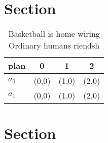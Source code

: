 \documentclass[a4paper]{article}
\begin{document}
\section{Section}

\begin{table}
\begin{adjustbox}{width=0.5\columnwidth}
\begin{tabular}{|l|l|l|l|}
\hline
\textbf{plan} & \multicolumn{1}{c|}{\textbf{0}} & \multicolumn{1}{c|}{\textbf{1}} & \multicolumn{1}{c|}{\textbf{2}} \\ \hline
\textbf{$a_0$}  & (0,0) & (1,0) & (2,0) \\ \hline
\textbf{$a_1$}  & (0,0) & (1,0) & (2,0) \\ \hline
\end{tabular}
\end{adjustbox}
\caption{Basketball is home wiring Ordinary humans riendsh
}
\end{table}

\section{Section}
\end{document}
